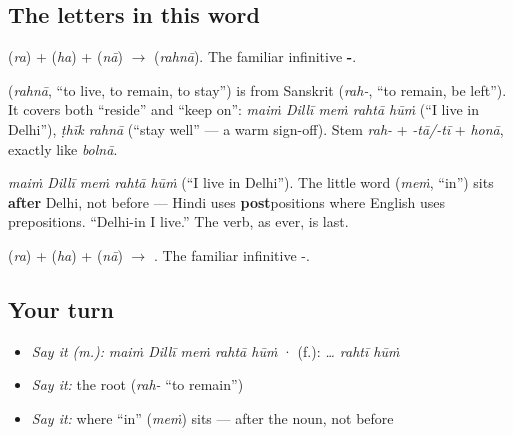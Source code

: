 \subsection*{The letters in this word}
\textbf{} (\emph{ra}) + \textbf{} (\emph{ha}) + \textbf{} (\emph{nā}) $\to$ \textbf{} (\emph{rahnā}). The familiar infinitive \textbf{-}.

\begin{cousinweb}
\textbf{} (\emph{rahnā}, \textquotedblleft{}to live, to remain, to stay\textquotedblright{}) is from Sanskrit \textbf{} (\emph{rah-}, \textquotedblleft{}to remain, be left\textquotedblright{}). It covers both \textquotedblleft{}reside\textquotedblright{} and \textquotedblleft{}keep on\textquotedblright{}: \emph{maiṁ Dillī meṁ rahtā hūṁ} (\textquotedblleft{}I live in Delhi\textquotedblright{}), \emph{ṭhīk rahnā} (\textquotedblleft{}stay well\textquotedblright{} — a warm sign-off). Stem \emph{rah-} + \emph{-tā/-tī} + \emph{honā}, exactly like \emph{bolnā}.
\end{cousinweb}

\begin{grammarlens}[title={Grammar Lens: \textquotedblleft{}in\textquotedblright{} comes after the noun}]
\emph{maiṁ Dillī meṁ rahtā hūṁ} (\textquotedblleft{}I live in Delhi\textquotedblright{}). The little word \textbf{} (\emph{meṁ}, \textquotedblleft{}in\textquotedblright{}) sits \textbf{after} Delhi, not before — Hindi uses \textbf{post}positions where English uses prepositions. \textquotedblleft{}Delhi-in I live.\textquotedblright{} The verb, as ever, is last.
\end{grammarlens}

\begin{sounds}
 (\emph{ra}) +  (\emph{ha}) +  (\emph{nā}) $\to$ . The familiar infinitive -.
\end{sounds}

\subsection*{Your turn}
\begin{itemize}
\raggedright
  \item \emph{Say it (m.):} \emph{maiṁ Dillī meṁ rahtā hūṁ}  ·  (f.): \emph{… rahtī hūṁ}
  \item \emph{Say it:} the root (\emph{rah-} \textquotedblleft{}to remain\textquotedblright{})
  \item \emph{Say it:} where \textquotedblleft{}in\textquotedblright{} (\emph{meṁ}) sits — after the noun, not before
\end{itemize}

